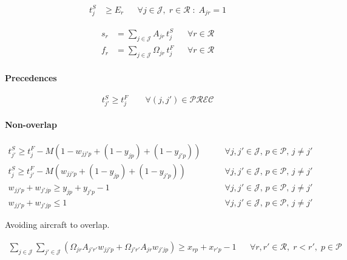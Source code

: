 \begin{align}
t^S_j &\ge E_r 
&& \forall j \in \mathcal{J}, \; r \in \mathcal{R} \; : \; A_{jr} = 1 
\end{align}


\begin{align}
s_r & = \sum_{j \in \mathcal{J}} A_{jr}\, t^{S}_j
&& \forall r \in \mathcal{R}
\\
f_r & = \sum_{j \in \mathcal{J}} \Omega_{jr}\, t^{F}_j
&& \forall r \in \mathcal{R}
\end{align}

\paragraph{Precedences}

\begin{equation}
t^{S}_{j'} \ge t^{F}_j
\qquad \forall (j,j') \in \mathcal{PREC}
\end{equation}


\paragraph{Non-overlap}

\begin{align}
t^{S}_{j'} \ge t^{F}_j 
- M \left( 1 - w_{jj'p} + (1-y_{jp}) + (1-y_{j'p}) \right)
& \qquad \forall j, j' \in \mathcal{J}, \, p \in \mathcal{P}, \, j \neq j'
\\
t^{S}_{j} \ge t^{F}_{j'} 
- M \left( w_{jj'p} + (1-y_{jp}) + (1-y_{j'p}) \right)
& \qquad \forall j, j' \in \mathcal{J}, \, p \in \mathcal{P}, \, j \neq j' \\
w_{jj'p} + w_{j'jp} \ge y_{jp} + y_{j'p} - 1
& \qquad \forall j, j' \in \mathcal{J}, \, p \in \mathcal{P}, \, j \neq j' \\
w_{jj'p} + w_{j'jp} \le 1
& \qquad \forall j, j' \in \mathcal{J}, \, p \in \mathcal{P}, \, j \neq j'
\end{align}

Avoiding aircraft to overlap.

\begin{align}
\sum_{j \in \mathcal{J}} \sum_{j' \in \mathcal{J}} \left( \Omega_{jr} A_{j'r'} w_{jj'p} + \Omega_{j'r'} A_{jr} w_{j'jp} \right) \ge x_{rp} + x_{r'p} - 1
&& \forall r,r' \in \mathcal{R},\; r < r',\; p \in \mathcal{P}
\label{eq:non-overlap-aircraft}
\end{align}

